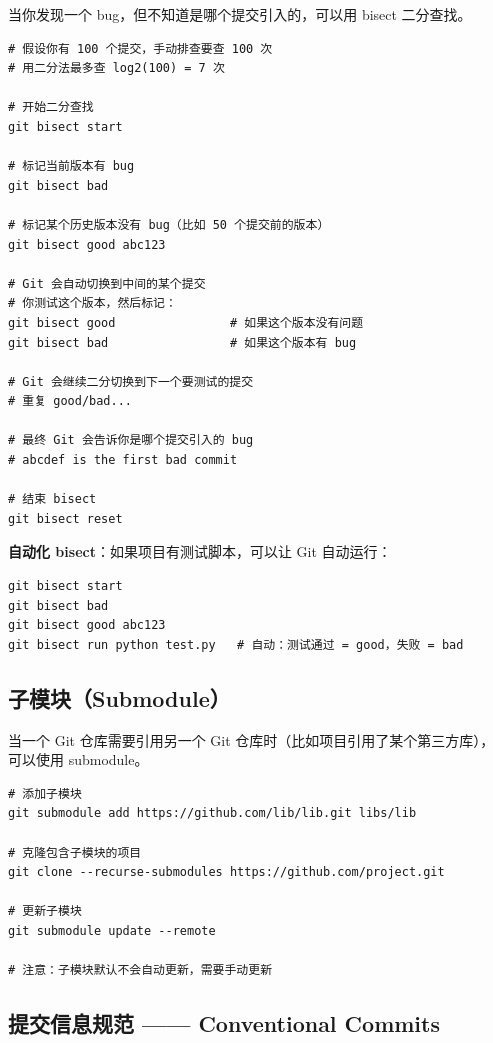 \documentclass[12pt,a4paper]{article}
\begin{document}
当你发现一个 bug，但不知道是哪个提交引入的，可以用 bisect 二分查找。

\begin{lstlisting}
# 假设你有 100 个提交，手动排查要查 100 次
# 用二分法最多查 log2(100) = 7 次

# 开始二分查找
git bisect start

# 标记当前版本有 bug
git bisect bad

# 标记某个历史版本没有 bug（比如 50 个提交前的版本）
git bisect good abc123

# Git 会自动切换到中间的某个提交
# 你测试这个版本，然后标记：
git bisect good                # 如果这个版本没有问题
git bisect bad                 # 如果这个版本有 bug

# Git 会继续二分切换到下一个要测试的提交
# 重复 good/bad...

# 最终 Git 会告诉你是哪个提交引入的 bug
# abcdef is the first bad commit

# 结束 bisect
git bisect reset
\end{lstlisting}

\textbf{自动化 bisect}：如果项目有测试脚本，可以让 Git 自动运行：

\begin{lstlisting}
git bisect start
git bisect bad
git bisect good abc123
git bisect run python test.py   # 自动：测试通过 = good，失败 = bad
\end{lstlisting}

\subsection{子模块（Submodule）}

当一个 Git 仓库需要引用另一个 Git 仓库时（比如项目引用了某个第三方库），
可以使用 submodule。

\begin{lstlisting}
# 添加子模块
git submodule add https://github.com/lib/lib.git libs/lib

# 克隆包含子模块的项目
git clone --recurse-submodules https://github.com/project.git

# 更新子模块
git submodule update --remote

# 注意：子模块默认不会自动更新，需要手动更新
\end{lstlisting}

\subsection{提交信息规范 —— Conventional Commits}
\end{document}
